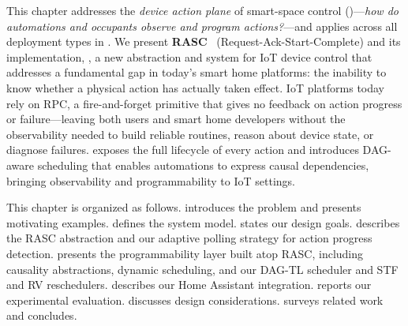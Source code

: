 This chapter addresses the \emph{device action plane} of smart-space control ()---\emph{how do automations and occupants observe and program actions?}---and applies across all deployment types in . We present \textbf{RASC}~\cite{rasc} (Request-Ack-Start-Complete) and its implementation, \sysname, a new abstraction and system for IoT device control that addresses a fundamental gap in today's smart home platforms: the inability to know whether a physical action has actually taken effect. IoT platforms today rely on RPC, a fire-and-forget primitive that gives no feedback on action progress or failure---leaving both users and smart home developers without the observability needed to build reliable routines, reason about device state, or diagnose failures. \sysname{} exposes the full lifecycle of every action and introduces DAG-aware scheduling that enables automations to express causal dependencies, bringing observability and programmability to IoT settings.

This chapter is organized as follows.  introduces the problem and presents motivating examples.  defines the system model.  states our design goals.  describes the RASC abstraction and our adaptive polling strategy for action progress detection.  presents the programmability layer built atop RASC, including causality abstractions, dynamic scheduling, and our DAG-TL scheduler and STF and RV reschedulers.  describes our Home Assistant integration.  reports our experimental evaluation.  discusses design considerations.  surveys related work and  concludes.
